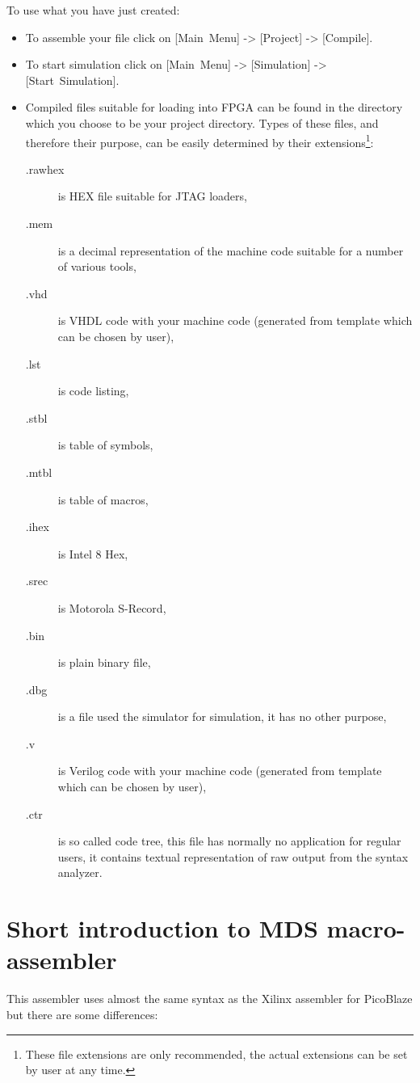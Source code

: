     To use what you have just created:
    \begin{itemize}
        \item
            To assemble your file click on [Main~Menu] -> [Project] -> [Compile].
        \item
            To start simulation click on [Main~Menu] -> [Simulation] -> [Start~Simulation].
        \item
            Compiled files suitable for loading into FPGA can be found in the directory which you choose to be your project directory. Types of these files, and therefore their purpose, can be easily determined by their extensions\footnote{These file extensions are only recommended, the actual extensions can be set by user at any time.}:
            \begin{description}
                \item [.rawhex] is HEX file suitable for JTAG loaders,
                \item [.mem] is a decimal representation of the machine code suitable for a number of various tools,
                \item [.vhd] is VHDL code with your machine code (generated from template which can be chosen by user),
                \item [.lst] is code listing,
                \item [.stbl] is table of symbols,
                \item [.mtbl] is table of macros,
                \item [.ihex] is Intel 8 Hex,
                \item [.srec] is Motorola S-Record,
                \item [.bin] is plain binary file,
                \item [.dbg] is a file used the simulator for simulation, it has no other purpose,
                \item [.v] is Verilog code with your machine code (generated from template which can be chosen by user),
                \item [.ctr] is so called code tree, this file has normally no application for regular users, it contains textual representation of raw output from the syntax analyzer.
            \end{description}
    \end{itemize}

\section{Short introduction to MDS macro-assembler}
    This assembler uses almost the same syntax as the Xilinx assembler for PicoBlaze but there are some differences:

